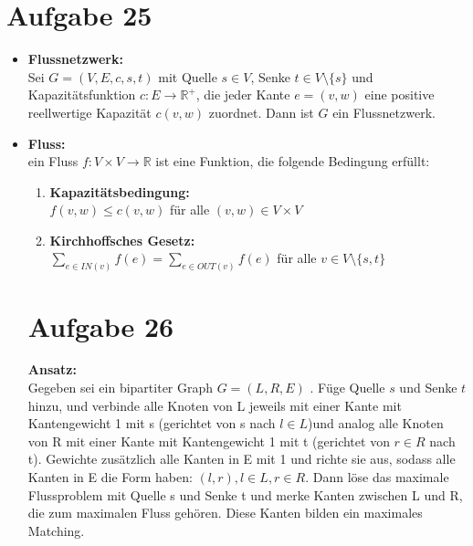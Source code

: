 \documentclass[10pt,a4paper]{article}
\begin{document}
\section*{Aufgabe 25}

    \begin{itemize}
        
        \item \textbf{Flussnetzwerk:}\\
        Sei $G = (V,E,c,s,t) $ mit Quelle $s \in  V$, Senke $t \in V \setminus \{s\}$ und
        Kapazitätsfunktion $c : E \rightarrow \mathbb{R}^+$, die jeder Kante $ e = (v,w)$ eine
        positive reellwertige Kapazität $c(v,w)$ zuordnet. Dann ist $G$ ein Flussnetzwerk.
        
        \item \textbf{Fluss:}\\
            ein Fluss $f : V \times V \rightarrow \mathbb{R}$ ist eine Funktion, die
            folgende Bedingung erfüllt:
            \begin{enumerate}
                \item \textbf{Kapazitätsbedingung:}
                    \\ $f(v,w) \leq c(v,w) $ für alle $(v,w) \in V \times V$
                    
                \item \textbf{Kirchhoffsches Gesetz:}
                    \\$\sum\limits_{e \in IN(v)} f(e) = \sum\limits_{e \in OUT(v)} f(e)$
                    für alle $v \in V \setminus \{s,t\} $
            \end{enumerate}
            
\section*{Aufgabe 26}

    \textbf{Ansatz:} \\
    Gegeben sei ein bipartiter Graph $G = (L,R,E)$ . Füge Quelle $s$ und Senke $t$
    hinzu, und verbinde alle Knoten von L jeweils mit einer Kante mit Kantengewicht 1 mit s
    (gerichtet von s nach $l \in L$)und
    analog alle Knoten von R mit einer Kante mit Kantengewicht 1 mit t (gerichtet von $r \in R$ nach t).
    Gewichte zusätzlich alle Kanten in E mit 1 und richte sie aus, sodass alle
    Kanten in E die Form haben: $ (l,r), l\in L, r \in R$. Dann löse das maximale Flussproblem
    mit Quelle s und Senke t und merke Kanten zwischen L und R, die zum maximalen Fluss
    gehören. Diese Kanten bilden ein maximales Matching.

    \end{itemize}
\end{document}
